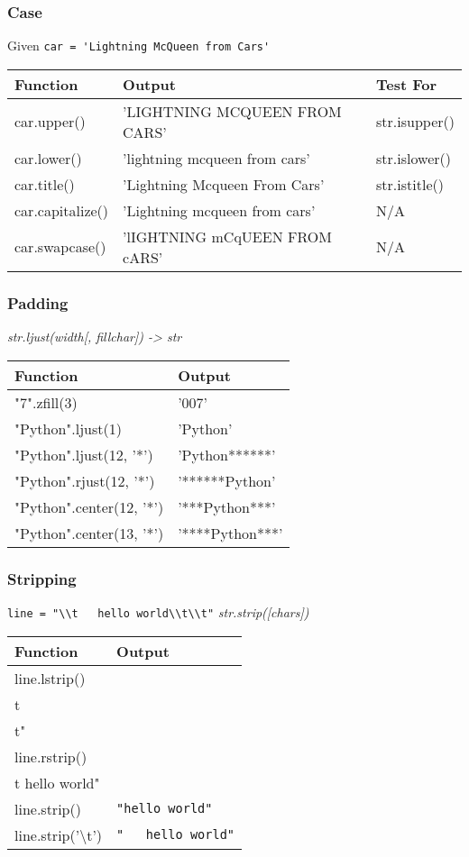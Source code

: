 \documentclass{beamer}
\begin{document}
%
%
\begin{frame}
  \frametitle{Case}
  Given \lstinline{car = 'Lightning McQueen from Cars'}
  \begin{table}
    \begin{tabular}{l | l | l}
    Function & Output & Test For \\
    \hline
    car.upper() & 'LIGHTNING MCQUEEN FROM CARS' & str.isupper() \\
    car.lower() & 'lightning mcqueen from cars' & str.islower() \\
    car.title() & 'Lightning Mcqueen From Cars' & str.istitle() \\
    car.capitalize() & 'Lightning mcqueen from cars' & N/A \\
    car.swapcase() & 'lIGHTNING mCqUEEN FROM cARS' & N/A
    \end{tabular}
  \end{table}
\end{frame}


%
%
\begin{frame}
  \frametitle{Padding}
  \textit{str.ljust(width[, fillchar]) -> str}
  \begin{table}
    \begin{tabular}{l | l}
    Function & Output \\
    \hline
    "7".zfill(3) & '007' \\
    "Python".ljust(1) & 'Python' \\
    "Python".ljust(12, '*') & 'Python******' \\
    "Python".rjust(12, '*') & '******Python' \\
    "Python".center(12, '*') & '***Python***' \\
    "Python".center(13, '*') & '****Python***'
    \end{tabular}
  \end{table}
\end{frame}


%
%
\begin{frame}
  \frametitle{Stripping}
  \lstinline{line = "\\t   hello world\\t\\t"}
  \textit{str.strip([chars])}
  \begin{table}
    \begin{tabular}{l | l}
    Function & Output \\
    \hline
    line.lstrip()     & \lstinline{"hello world\\t\\t"} \\
    line.rstrip()     & \lstinline{"\\t   hello world"} \\
    line.strip()      & \lstinline{"hello world"}       \\
    line.strip('\textbackslash t') & \lstinline{"   hello world"}
    \end{tabular}
  \end{table}
\end{frame}
\end{document}
